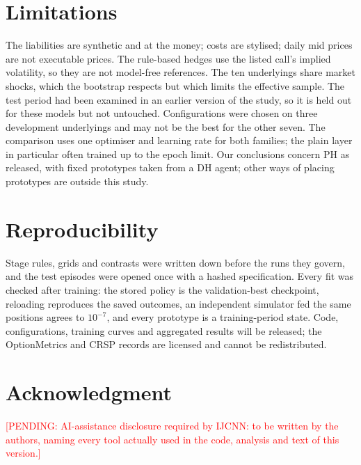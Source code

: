 \documentclass[10pt,conference]{IEEEtran}
\newcommand{\pending}[1]{\textcolor{red}{[PENDING: #1]}}
\begin{document}
\section{Limitations}
The liabilities are synthetic and at the money; costs are stylised; daily mid
prices are not executable prices. The rule-based hedges use the listed call's
implied volatility, so they are not model-free references. The ten
underlyings share market shocks, which the bootstrap respects but which
limits the effective sample. The test period had been examined in an earlier
version of the study, so it is held out for these models but not untouched.
Configurations were chosen on three development underlyings and may not be
the best for the other seven. The comparison uses one optimiser and learning
rate for both families; the plain layer in particular often trained up to
the epoch limit. Our conclusions concern PH as released, with fixed
prototypes taken from a DH agent; other ways of placing prototypes are
outside this study.

\section{Reproducibility}
Stage rules, grids and contrasts were written down before the runs they
govern, and the test episodes were opened once with a hashed specification.
Every fit was checked after training: the stored policy is the
validation-best checkpoint, reloading reproduces the saved outcomes, an
independent simulator fed the same positions agrees to $10^{-7}$, and every
prototype is a training-period state. Code, configurations, training curves
and aggregated results will be released; the OptionMetrics and CRSP records
are licensed and cannot be redistributed.

\section*{Acknowledgment}
\pending{AI-assistance disclosure required by IJCNN: to be written by the
authors, naming every tool actually used in the code, analysis and text of
this version.}



\end{document}
